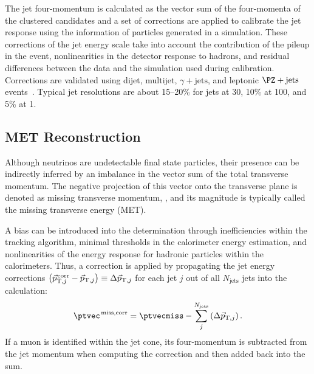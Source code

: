 The jet four-momentum is calculated as the vector sum of the four-momenta of the clustered candidates and a set of corrections are applied to calibrate the jet response using the information of particles generated in a simulation.
These corrections of the jet energy scale take into account the contribution of the pileup in the event, nonlinearities in the detector response to hadrons, and residual differences between the data and the simulation used during calibration.
Corrections are validated using dijet, multijet, $\gamma + \text{jets}$, and leptonic $\PZ + \text{jets}$ events~\cite{collaboration_2011,CMS:2016lmd}.
Typical jet resolutions are about 15--20\% for jets at 30\GeV, 10\% at 100\GeV, and 5\% at 1\TeV.


\subsection{MET Reconstruction}
\label{sec:met_reco}
Although neutrinos are undetectable final state particles, their presence can be indirectly inferred by an imbalance in the vector sum of the total transverse momentum.
The negative projection of this vector onto the transverse plane is denoted as missing transverse momentum, \ptvecmiss, and its magnitude is typically called the missing transverse energy (MET).

A bias can be introduced into the \ptvecmiss determination through inefficiencies within the tracking algorithm, minimal thresholds in the calorimeter energy estimation, and nonlinearities of the energy response for hadronic particles within the calorimeters.
Thus, a correction is applied by propagating the jet energy corrections $\left( \vec{p}_{\text{T}, j}^{\kern1pt \text{corr}} - \vec{p}_{\text{T}, j} \right) \equiv \Delta \vec{p}_{\text{T}, j}$ for each jet $j$ out of all $N_\text{jets}$ jets into the calculation:
\begin{equation}
\ptvec^{\kern1pt \text{miss,corr}} =
    \ptvecmiss - \sum^{N_\text{jets}}_{j}
        \left( \Delta \vec{p}_{\text{T}, j} \right).
\end{equation}
If a muon is identified within the jet cone, its four-momentum is subtracted from the jet momentum when computing the correction and then added back into the \ptvecmiss sum.